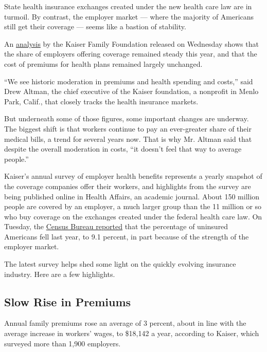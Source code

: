 State health insurance exchanges created under the new health care law
are in turmoil. By contrast, the employer market --- where the majority
of Americans still get their coverage --- seems like a bastion of
stability.

An \href{http://ehbs.kff.org/}{analysis} by the Kaiser Family Foundation
released on Wednesday shows that the share of employers offering
coverage remained steady this year, and that the cost of premiums for
health plans remained largely unchanged.

``We see historic moderation in premiums and health spending and
costs,'' said Drew Altman, the chief executive of the Kaiser foundation,
a nonprofit in Menlo Park, Calif., that closely tracks the health
insurance markets.

But underneath some of those figures, some important changes are
underway. The biggest shift is that workers continue to pay an
ever-greater share of their medical bills, a trend for several years
now. That is why Mr. Altman said that despite the overall moderation in
costs, ``it doesn't feel that way to average people.''

Kaiser's annual survey of employer health benefits represents a yearly
snapshot of the coverage companies offer their workers, and highlights
from the survey are being published online in Health Affairs, an
academic journal. About 150 million people are covered by an employer, a
much larger group than the 11 million or so who buy coverage on the
exchanges created under the federal health care law. On Tuesday, the
\href{http://www.nytimes.com/2016/09/14/business/economy/us-census-household-income-poverty-wealth-2015.html?hp\&action=click\&pgtype=Homepage\&clickSource=story-heading\&module=first-column-region\&region=top-news\&WT.nav=top-news\&_r=0}{Census
Bureau reported} that the percentage of uninsured Americans fell last
year, to 9.1 percent, in part because of the strength of the employer
market.

The latest survey helps shed some light on the quickly evolving
insurance industry. Here are a few highlights.

\hypertarget{slow-rise-in-premiums}{%
\subsection{Slow Rise in Premiums}\label{slow-rise-in-premiums}}

Annual family premiums rose an average of 3 percent, about in line with
the average increase in workers' wages, to \$18,142 a year, according to
Kaiser, which surveyed more than 1,900 employers.

